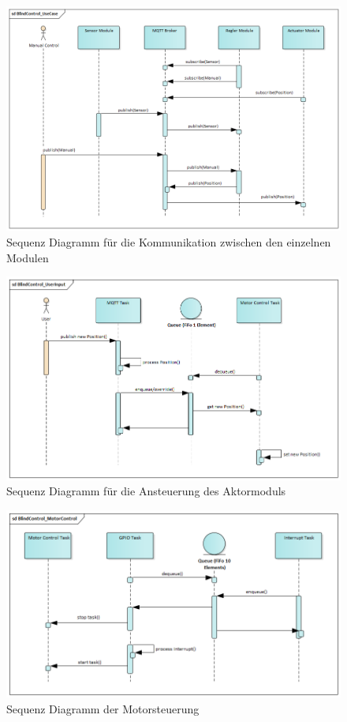 \begin{figure}[hbt]
	\centering
	\includegraphics[width=1\linewidth]{images/Sequence_UseCase}
	\caption[Sequence UseCase]{Sequenz Diagramm für die Kommunikation zwischen den einzelnen Modulen}
	\label{fig:Sequence_UseCase}
\end{figure}

\begin{figure}[hbt]
	\centering
	\includegraphics[width=1\linewidth]{images/Sequence_UserInput}
	\caption[Sequence UserInput]{Sequenz Diagramm für die Ansteuerung des Aktormoduls}
	\label{fig:Sequence_UserInput}
\end{figure}

\begin{figure}[hbt]
	\centering
	\includegraphics[width=1\linewidth]{images/Sequence_MotorControl}
	\caption[Sequence Diagramm MotorControl]{Sequenz Diagramm der Motorsteuerung}
	\label{fig:SequenceMotorControl}
\end{figure}

